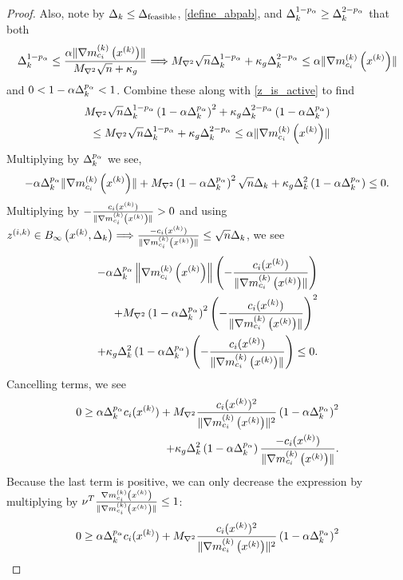 \begin{proof}
Also, note by $\Delta_k \le {\Delta_{\textrm{feasible}}}$, \cref{define_abpab}, and $\Delta_k^{1 - p_{\alpha}} \ge \Delta_k^{2 - p_{\alpha}}$ that both
\begin{align*}
\Delta_k^{1-p_{\alpha}} \le \frac{\alpha \|{\nabla m_{c_i}^{(k)}\left(x^{(k)}\right)}\|}{{M_{\nabla^2}} \sqrt{n} + \kappa_g} 
\Longrightarrow {M_{\nabla^2}} \sqrt{n}\Delta_k^{1- p_{\alpha}} + \kappa_g \Delta_k^{2 - p_{\alpha}} \le \alpha \|{\nabla m_{c_i}^{(k)}\left(x^{(k)}\right)}\|
\end{align*}
and $0 < 1 - \alpha \Delta_k^{p_{\alpha}} < 1$.
Combine these along with \cref{z_is_active} to find 
\begin{align*}
{M_{\nabla^2}} \sqrt{n}\Delta_k^{1-p_{\alpha}}\left(1 - \alpha \Delta_k^{p_{\alpha}}\right)^2  + \kappa_g \Delta_k^{2 - p_{\alpha}} \left(1 - \alpha \Delta_k^{p_{\alpha}}\right) \\
\le {M_{\nabla^2}} \sqrt{n}\Delta_k^{1 - p_{\alpha}} + \kappa_g \Delta_k^{2 - p_{\alpha}} \le \alpha \|{\nabla m_{c_i}^{(k)}\left(x^{(k)}\right)}\|
\end{align*}
Multiplying by $\Delta_k^{p_{\alpha}}$ we see,
\begin{align*}
-\alpha \Delta_k^{p_{\alpha}}\|{\nabla m_{c_i}^{(k)}\left(x^{(k)}\right)}\| + {M_{\nabla^2}} \left(1 - \alpha \Delta_k^{p_{\alpha}}\right)^2 \sqrt{n}\Delta_k+ \kappa_g \Delta_k^2 \left(1 - \alpha \Delta_k^{p_{\alpha}}\right) \le  0.
\end{align*}
Multiplying by $-\frac{c_i(x^{(k)})}{\|{\nabla m_{c_i}^{(k)}\left(x^{(k)}\right)}\|} > 0$ and using ${z^{(i, k)}} \in { B_{\infty}\left(x^{(k)}, \Delta_k\right) } \Longrightarrow \frac{-c_i(x^{(k)})}{\|{\nabla m_{c_i}^{(k)}\left(x^{(k)}\right)}\|} \le \sqrt{n}\Delta_k$, we see
\begin{align*}
-\alpha \Delta_k^{p_{\alpha}}\left\|{\nabla m_{c_i}^{(k)}\left(x^{(k)}\right)}\right\|\left(-\frac{c_i(x^{(k)})}{\|{\nabla m_{c_i}^{(k)}\left(x^{(k)}\right)}\|}\right)  \\
+ {M_{\nabla^2}} \left(1 - \alpha \Delta_k^{p_{\alpha}}\right)^2 \left(-\frac{c_i(x^{(k)})}{\|{\nabla m_{c_i}^{(k)}\left(x^{(k)}\right)}\|}\right)^2 \\
+\kappa_g \Delta_k^2 \left(1 - \alpha \Delta_k^{p_{\alpha}}\right)\left(-\frac{c_i(x^{(k)})}{\|{\nabla m_{c_i}^{(k)}\left(x^{(k)}\right)}\|}\right) \le 0.
\end{align*}
Cancelling terms, we see
\begin{align*}
0 
\ge \alpha \Delta_k^{p_{\alpha}} c_i(x^{(k)}) 
+ {M_{\nabla^2}} \frac {c_i(x^{(k)})^2}{\|{\nabla m_{c_i}^{(k)}\left(x^{(k)}\right)}\|^2}\left(1 - \alpha \Delta_k^{p_{\alpha}}\right)^2 \\
+ \kappa_g \Delta_k^2 \left(1 - \alpha \Delta_k^{p_{\alpha}}\right)\frac{-c_i(x^{(k)})}{\|{\nabla m_{c_i}^{(k)}\left(x^{(k)}\right)}\|}.
\end{align*}
Because the last term is positive, we can only decrease the expression by multiplying by $\nu^T \frac{{\nabla m_{c_i}^{(k)}\left(x^{(k)}\right)}}{\|{\nabla m_{c_i}^{(k)}\left(x^{(k)}\right)}\|} \le 1$:
\begin{align*}
0\ge \alpha \dk^{p_{\alpha}} c_i(\xk) + \maxhessian \frac {c_i(\xk)^2}{\|\gmcik\|^2}\left(1 - \alpha \dk^{p_{\alpha}}\right)^2  \\

\end{align*}
\end{proof}

